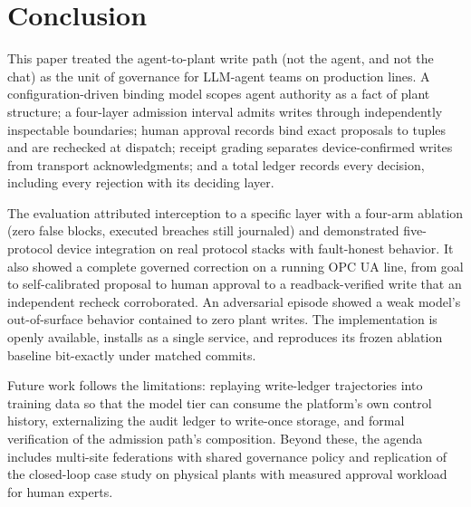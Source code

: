 \section{Conclusion}
\label{sec:conclusion}

This paper treated the agent-to-plant write path (not the agent, and
not the chat) as the unit of governance for LLM-agent teams on
production lines. A configuration-driven binding model scopes agent
authority as a fact of plant structure; a four-layer admission interval
admits writes through independently inspectable boundaries; human
approval records bind exact proposals to tuples and are rechecked at
dispatch; receipt grading separates device-confirmed writes from
transport acknowledgments; and a total ledger records every decision,
including every rejection with its deciding layer.

The evaluation attributed interception to a specific layer with a
four-arm ablation (zero false blocks, executed breaches still journaled)
and demonstrated five-protocol device integration on real protocol stacks
with fault-honest behavior. It also showed a complete governed correction
on a running OPC UA line, from goal to self-calibrated proposal to human
approval to a readback-verified write that an independent recheck
corroborated. An adversarial episode showed a weak model's
out-of-surface behavior contained to zero plant writes. The
implementation is openly available, installs as a single service, and
reproduces its frozen ablation baseline bit-exactly under matched
commits.

Future work follows the limitations: replaying write-ledger trajectories
into training data so that the model tier can consume the platform's own
control history, externalizing the audit ledger to write-once storage,
and formal verification of the admission path's composition. Beyond
these, the agenda includes multi-site federations with shared governance
policy and replication of the closed-loop case study on physical plants
with measured approval workload for human experts.
